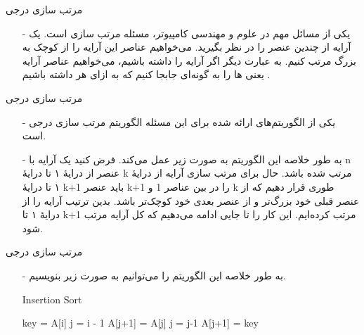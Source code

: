 \begin{frame}{‌مرتب سازی درجی}
\begin{itemize}\itemr
\item[-]
یکی از مسائل مهم در علوم و مهندسی کامپیوتر، مسئله مرتب سازی است. یک آرایه از چندین عنصر را در نظر بگیرید. می‌خواهیم عناصر این آرایه را از کوچک به بزرگ مرتب کنیم. به عبارت دیگر اگر آرایه
را داشته باشیم، می‌خواهیم عناصر آرایه یعنی
ها
را به گونه‌ای جابجا کنیم که به ازای هر
داشته باشیم
.
\end{itemize}
\end{frame}


\begin{frame}{‌مرتب سازی درجی}
\begin{itemize}\itemr
\item[-]
یکی از الگوریتم‌های ارائه شده برای این مسئله الگوریتم مرتب سازی درجی
است.
\item[-]
به طور خلاصه این الگوریتم به صورت زیر عمل می‌کند. فرض کنید یک آرایه با n عنصر از درایهٔ ۱ تا درایهٔ k مرتب شده باشد. حال برای مرتب سازی آرایه از درایهٔ ۱ تا درایهٔ 
k+1
باید عنصر
k+1
را در بین عناصر 1 و k طوری قرار دهیم که از عنصر قبلی خود بزرگ‌تر و از عنصر بعدی خود کوچک‌تر باشد. بدین ترتیب آرایه را از درایهٔ ۱ تا k+1 مرتب کرده‌ایم. این کار را تا جایی ادامه می‌دهیم که کل آرایه مرتب شود.
\end{itemize}
\end{frame}


\begin{frame}{‌مرتب سازی درجی}
\begin{itemize}\itemr
\item[-]
به طور خلاصه این الگوریتم را می‌توانیم به صورت زیر بنویسیم.
\begin{algorithm}[H]\alglr
  \caption{Insertion Sort} 
  \begin{algorithmic}[1]
    \newline{}
        \State key = A[i]
        \State j = i - 1
          \State A[j+1] = A[j]
          \State j = j-1
	\EndWhile
        \State A[j+1] = key
      \EndFor
  \end{algorithmic}
  \label{alg:insertion-sort}
\end{algorithm}
\end{itemize}
\end{frame}


